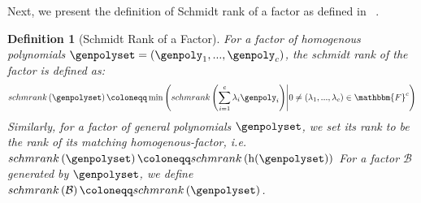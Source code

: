 \documentclass[10pt,a4paper]{article}
\newtheorem{definition}[theorem]{Definition}
\newcommand{\definedas}[0]{\coloneqq}
\newcommand{\parens}[1]{\left( #1 \right)}
\newcommand{\suchthat}[0]{\middle|}
\newcommand{\basefield}[0]{\mathbbm{F}}
\newcommand{\factor}[0]{\mathcal{B}}
\newcommand{\homopart}[1]{\mathrm{h}({#1})}
\newcommand{\schmrank}[1]{schmrank \parens{#1}}
\begin{document}
Next, we present the definition of Schmidt rank of a factor as defined in ~\cite{lampert2021relative}.
\begin{definition}[Schmidt Rank of a Factor]
    For a factor of homogenous polynomials $\genpolyset = (\genpoly_1,...,\genpoly_{c})$, the schmidt rank of the factor is defined as:
    \[
        \schmrank{\genpolyset} \definedas \min \parens{\schmrank{\sum_{i=1}^{c}\lambda_i \genpoly_i} \suchthat 0 \neq (\lambda_1,...,\lambda_c) \in \basefield^c}
    \]
    Similarly, for a factor of general polynomials $\genpolyset$, we set its rank to be the rank of its matching homogenous-factor,
    i.e. $\schmrank{\genpolyset} \definedas \schmrank{\homopart{\genpolyset}}$
    For a factor $\factor$ generated by $\genpolyset$, we define $\schmrank{\factor} \definedas \schmrank{\genpolyset}$.
\end{definition}
\end{document}
